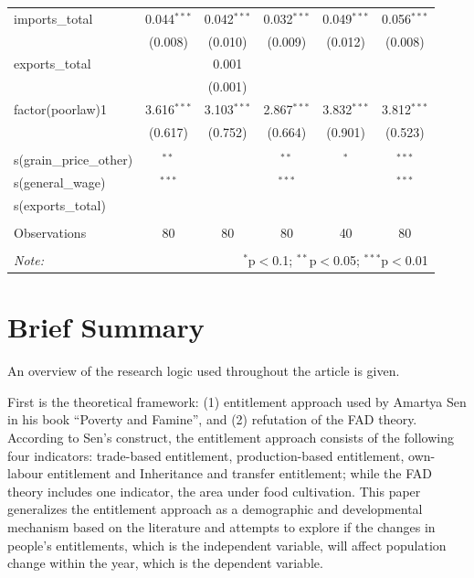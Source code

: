 \begin{table}[h]
\begin{tabular}{@{\extracolsep{5pt}}lccccc}
    imports\_total & 0.044$^{***}$ & 0.042$^{***}$ & 0.032$^{***}$ & 0.049$^{***}$ & 0.056$^{***}$ \\
     & (0.008) & (0.010) & (0.009) & (0.012) & (0.008) \\
    exports\_total & & 0.001 & & & \\
     & & (0.001) & & & \\
    factor(poorlaw)1 & 3.616$^{***}$ & 3.103$^{***}$ & 2.867$^{***}$ & 3.832$^{***}$ & 3.812$^{***}$ \\
     & (0.617) & (0.752) & (0.664) & (0.901) & (0.523) \\
    \hline \\[-1.8ex]
    s(grain\_price\_other) & $^{**}$ & & $^{**}$ & $^{*}$ & $^{***}$  \\
    s(general\_wage) & $^{***}$ & & $^{***}$ & & $^{***}$ \\
    s(exports\_total) & & & \\
    \hline \\[-1.8ex]
    Observations & 80 & 80 & 80 & 40 & 80 \\
    \hline
    \hline \\[-1.8ex]
    \textit{Note:} & \multicolumn{5}{r}{$^{*}$p$<$0.1; $^{**}$p$<$0.05; $^{***}$p$<$0.01} \\
    \end{tabular}
\end{table}

\section{Brief Summary}

An overview of the research logic used throughout the article is given.

First is the theoretical framework: (1) entitlement approach used by Amartya Sen in his book ``Poverty and Famine'', and (2) refutation of the FAD theory. According to Sen's construct, the entitlement approach consists of the following four indicators: trade-based entitlement, production-based entitlement, own-labour entitlement and Inheritance and transfer entitlement; while the FAD theory includes one indicator, the area under food cultivation. This paper generalizes the entitlement approach as a demographic and developmental mechanism based on the literature and attempts to explore if the changes in people's entitlements, which is the independent variable, will affect population change within the year, which is the dependent variable.

